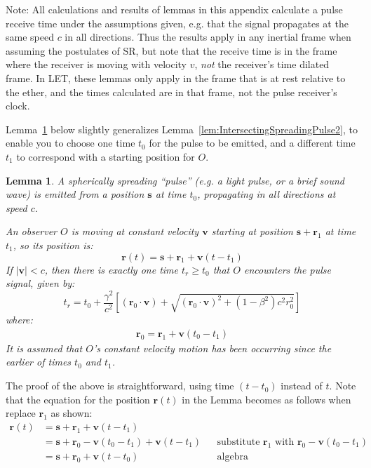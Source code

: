 \documentclass[a4paper]{article}
\theoremstyle{plain}
\newtheorem{lemma}[theorem]{Lemma}
\theoremstyle{definition}
\newcommand{\vect}[1]{\mathbf{#1}}
\begin{document}
Note: All calculations and results of lemmas in this appendix
calculate a pulse receive time under the assumptions given, e.g. that
the signal propagates at the same speed $c$ in all directions.  Thus
the results apply in any inertial frame when assuming the postulates
of SR, but note that the receive time is in the frame where the
receiver is moving with velocity $v$, {\em not} the receiver's time
dilated frame.
In LET, these lemmas only apply in the frame that is at rest relative
to the ether, and the times calculated are in that frame, not the
pulse receiver's clock.

Lemma~\ref{lem:IntersectingSpreadingPulse} below slightly generalizes
Lemma~\ref{lem:IntersectingSpreadingPulse2}, to enable you to choose
one time $t_0$ for the pulse to be emitted, and a different time $t_1$
to correspond with a starting position for $O$.
\begin{lemma}
\label{lem:IntersectingSpreadingPulse}
A spherically spreading ``pulse'' (e.g. a light pulse, or a brief
sound wave) is emitted from a position $\vect{s}$ at time $t_0$,
propagating in all directions at speed $c$.

An observer $O$ is moving at constant velocity $\vect{v}$ starting at
position $\vect{s} + \vect{r}_1$ at time $t_1$, so its position is:
\begin{equation}
\vect{r}(t) = \vect{s} + \vect{r}_1 + \vect{v}(t - t_1)
\end{equation}
If $|\vect{v}| < c$, then there is exactly one time $t_r \geq t_0$
that $O$ encounters the pulse signal, given by:
\begin{equation}
t_r = t_0 + \frac{\gamma^2}{c^2} \left[ (\vect{r}_0 \cdot \vect{v}) + \sqrt{(\vect{r}_0 \cdot \vect{v})^2 + (1-\beta^2)c^2 r_0^2} \right]
\end{equation}
where:
\begin{align*}
\vect{r}_0 = \vect{r}_1 + \vect{v}(t_0-t_1)
\end{align*}
It is assumed that $O$'s constant velocity motion has been occurring
since the earlier of times $t_0$ and $t_1$.
\end{lemma}

The proof of the above is straightforward, using time $(t-t_0)$
instead of $t$.  Note that the equation for the position $\vect{r}(t)$
in the Lemma becomes as follows when replace $\vect{r}_1$ as shown:
\begin{align*}
\vect{r}(t)
  & = \vect{s} + \vect{r}_1 + \vect{v}(t - t_1) \\
  & = \vect{s} + \vect{r}_0 - \vect{v}(t_0-t_1) + \vect{v}(t - t_1) & & \text{substitute $\vect{r}_1$ with $\vect{r}_0 - \vect{v}(t_0-t_1)$} \\
  & = \vect{s} + \vect{r}_0 + \vect{v}(t - t_0) & & \text{algebra}
\end{align*}
\end{document}
